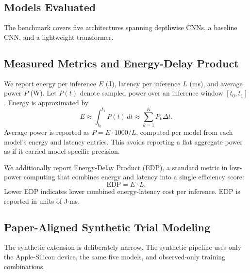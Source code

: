 \documentclass{svproc}
\begin{document}
\subsection{Models Evaluated}
The benchmark covers five architectures spanning depthwise CNNs, a baseline
CNN, and a lightweight transformer.

\begin{table}[ht]
\centering
\caption{Architectures evaluated.}
\end{table}

\subsection{Measured Metrics and Energy-Delay Product}
We report energy per inference $E$ (J), latency per inference $L$ (ms), and
average power $P$ (W). Let $P(t)$ denote sampled power over an inference window
$[t_0, t_1]$. Energy is approximated by
\begin{equation}
E \approx \int_{t_0}^{t_1} P(t)\,dt \approx \sum_{k=1}^{K} P_k \Delta t.
\end{equation}
Average power is reported as $P = E \cdot 1000 / L$, computed per model from
each model's energy and latency entries. This avoids reporting a flat aggregate
power as if it carried model-specific precision.

We additionally report Energy-Delay Product (EDP), a standard metric in
low-power computing \cite{horowitz2014} that combines energy and latency into
a single efficiency score:
\begin{equation}
\text{EDP} = E \cdot L.
\end{equation}
Lower EDP indicates lower combined energy-latency cost per inference. EDP is
reported in units of J$\cdot$ms.

\subsection{Paper-Aligned Synthetic Trial Modeling}
The synthetic extension is deliberately narrow. The synthetic pipeline uses
only the Apple-Silicon device, the same five models, and observed-only
training combinations.
\end{document}
